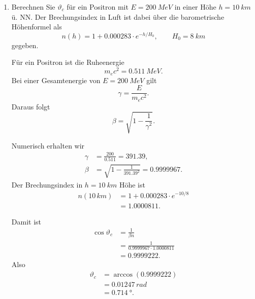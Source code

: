 \documentclass[11pt,a4paper]{scrartcl}
\begin{document}
    \begin{enumerate}[label=(\alph*)]
        \item
            Berechnen Sie $\vartheta_c$ für ein Positron mit $E=\SI{200}{MeV}$ in einer Höhe
            $h=\SI{10}{km}$ ü. NN. Der Brechungsindex in Luft ist dabei über die
            barometrische Höhenformel als
            \[
                n(h)=1+0.000283\cdot e^{-h/H_0},\qquad H_0=\SI{8}{km}
            \]
            gegeben.

            \begin{calculationbox}
                Für ein Positron ist die Ruheenergie
                \[
                    m_ec^2=\SI{0.511}{MeV}.
                \]
                Bei einer Gesamtenergie von $E=\SI{200}{MeV}$ gilt
                \[
                    \gamma=\frac{E}{m_ec^2}.
                \]
                Daraus folgt
                \[
                    \beta=\sqrt{1-\frac{1}{\gamma^2}}.
                \]

                \begin{calculationbox}
                    Numerisch erhalten wir
                    \begin{align*}
                        \gamma&=\frac{200}{0.511}=391.39,\\
                        \beta&=\sqrt{1-\frac{1}{391.39^2}}=0.9999967.
                    \end{align*}
                    Der Brechungsindex in $h=\SI{10}{km}$ Höhe ist
                    \begin{align*}
                        n(10\,\si{km})
                        &=1+0.000283\cdot e^{-10/8}\\
                        &=1.0000811.
                    \end{align*}
                \end{calculationbox}

                \begin{calculationbox}
                    Damit ist
                    \begin{align*}
                        \cos\vartheta_c
                        &=\frac{1}{\beta n}\\
                        &=\frac{1}{0.9999967\cdot1.0000811}\\
                        &=0.9999222.
                    \end{align*}
                    Also
                    \begin{align*}
                        \vartheta_c
                        &=\arccos(0.9999222)\\
                        &=0.01247\,\si{rad}\\
                        &=\SI{0.714}{\degree}.
                    \end{align*}
                \end{calculationbox}
            \end{calculationbox}


\end{enumerate}
\end{document}
